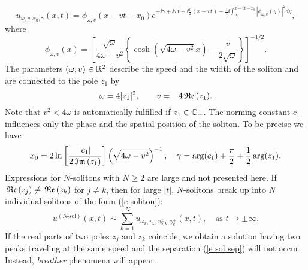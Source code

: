 \begin{equation}\label{e soliton}
    u_{\omega,v,x_0,\gamma}(x,t)=\phi_{\omega,v}(x-vt-x_0) e^{-\ii\gamma+\ii\omega t+\ii\frac{v}{2}(x-vt)- \frac{3}{4}\ii\int_{\infty}^{x-vt-x_0} |\phi_{\omega,v}(y)|^2dy},
\end{equation}
where
\begin{equation}\label{e sol ampl}
    \phi_{\omega,v}(x)=\left[\frac{\sqrt{\omega}}{4\omega-v^2} \left\{\cosh(\sqrt{4\omega-v^2}x)- \frac{v}{2\sqrt{\omega}}\right\}\right]^{-1/2}.
\end{equation}
The parameters $(\omega,v)\in \mathbb R^2$ describe the speed and the width of the soliton and  are connected to the pole $z_1$ by
\begin{equation}\label{e omega v}
        \omega=4|z_1|^2,\qquad
         v=-4\,\mathfrak{Re}\,(z_1).
\end{equation}
Note that $v^2<4\omega$ is automatically fulfilled if $z_1\in\mathbb C_+$. The norming constant $c_1$ influences only the phase and the spatial position of the soliton. To be precise we have
\begin{equation}\label{e x_0 gamma}
    x_0=2\ln\left[\frac{|c_1|}{2\,\mathfrak{Im}\,(z_1)}\right] \left(\sqrt{4\omega-v^2}\right)^{-1},
    \quad
    \gamma=\arg(c_1)+\frac{\pi}{2}+\frac{1}{2}\arg(z_1).
\end{equation}
Expressions for $N$-solitons with $N\geq2$ are large and not presented here. If $\,\mathfrak{Re}\,(z_j)
\neq\,\mathfrak{Re}\,(z_k)$ for $j\neq k$, then for large $|t|$, $N$-solitons break up into $N$  individual solitons of the form (\ref{e soliton}):
\begin{equation}\label{e sol sep}
    u^{(N\text{-sol})}(x,t)\sim \sum_{k=1}^N u_{\omega_k,v_k,x_{0,k}^{\pm},\gamma_k^{\pm}}(x,t), \quad\text{as }t\to\pm\infty.
\end{equation}
If the real parts of two poles $z_j$ and $z_k$ coincide, we obtain a solution having two peaks traveling at the same speed and the separation (\ref{e sol sep}) will not occur. Instead, \emph{breather} phenomena will appear. 